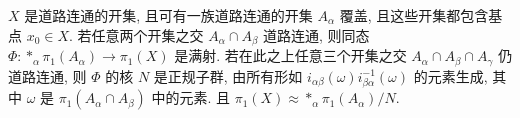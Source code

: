 \begin{theorem}
    $X$ 是道路连通的开集, 且可有一族道路连通的开集 $A_{\alpha}$ 覆盖, 且这些开集都包含基点 $x_0 \in X$.
    若任意两个开集之交 $A_{\alpha} \cap A_{\beta}$ 道路连通, 则同态 $\Phi: \ast_{\alpha}\pi_1(A_{\alpha}) \rightarrow \pi_1(X)$ 是满射. 若在此之上任意三个开集之交 $A_{\alpha} \cap A_{\beta} \cap A_{\gamma}$ 仍道路连通, 则 $\Phi$ 的核 $N$ 是正规子群, 由所有形如 $i_{\alpha\beta}(\omega)i_{\beta\alpha}^{-1}(\omega)$ 的元素生成, 其中 $\omega$ 是 $\pi_1(A_{\alpha} \cap A_{\beta})$ 中的元素. 且 $\pi_1(X) \approx \ast_{\alpha}\pi_1(A_{\alpha}) / N$.
\end{theorem}

